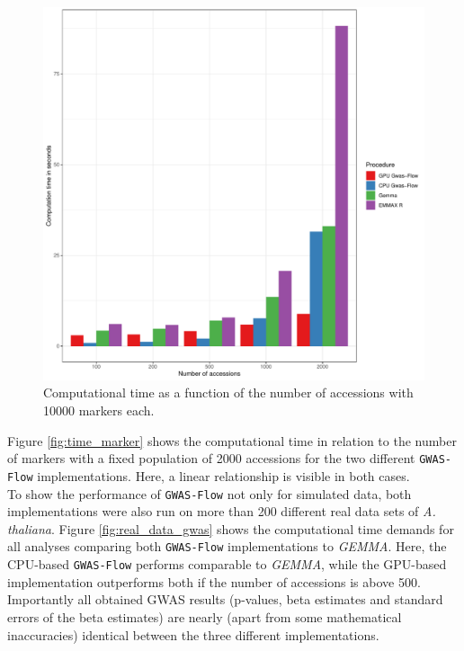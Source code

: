 \begin{figure}[H]
\centering
\includegraphics[height=.55\textheight, width=.99\textwidth]{Figures/comp_time_gwas}
\decoRule
\caption[Computation time vs accessions]{Computational time as a function of the number
  of accessions with 10000 markers each.}
\label{fig:time_accessions}
\end{figure}

Figure \ref{fig:time_marker} shows the computational time in relation to the number of
markers with a fixed population of 2000 accessions for the two different
\texttt{GWAS-Flow} implementations. Here, a linear relationship is visible in both
cases.\\
To show the performance of \texttt{GWAS-Flow} not only for simulated data, both
implementations were also run on more than 200 different real data sets of
\textit{A. thaliana}. Figure \ref{fig:real_data_gwas} shows the computational time demands for all analyses
comparing both \texttt{GWAS-Flow} implementations to \textit{GEMMA}. Here, the CPU-based
\texttt{GWAS-Flow} performs comparable to \textit{GEMMA}, while the GPU-based
implementation outperforms both if the number of accessions is above 500. Importantly all
obtained GWAS results (p-values, beta estimates and standard errors of the beta estimates)
are nearly (apart from some mathematical inaccuracies) identical between the three
different implementations.


